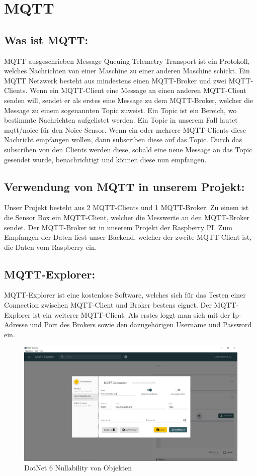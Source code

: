 \section{MQTT}

\subsection{Was ist MQTT:}
MQTT ausgeschrieben Message Queuing  Telemetry Transport ist ein Protokoll, welches Nachrichten von einer Maschine zu einer anderen Maschine schickt. 
Ein MQTT Netzwerk besteht  aus mindestens einen MQTT-Broker und zwei MQTT-Clients. 
Wenn ein MQTT-Client eine Message an einen anderen MQTT-Client senden will, sendet er als erstes eine Message zu dem MQTT-Broker, welcher die Message zu einem sogenannten Topic zuweist.
Ein Topic ist ein Bereich, wo bestimmte Nachrichten aufgelistet werden. 
Ein Topic in unserem Fall lautet mqtt/noice für den Noice-Sensor.  
Wenn ein oder mehrere MQTT-Clients diese Nachricht empfangen wollen, dann subscriben diese auf das Topic. 
Durch das subscriben von den Clients werden diese, sobald eine neue Message an das Topic gesendet wurde, benachrichtigt und können diese nun empfangen. 

\subsection {Verwendung von MQTT in unserem Projekt:}
Unser Projekt besteht aus 2 MQTT-Clients und 1 MQTT-Broker. 
Zu einem ist die Sensor Box ein MQTT-Client, welcher die Messwerte an den MQTT-Broker sendet. 
Der MQTT-Broker ist in unserem Projekt der Raspberry PI. 
Zum Empfangen der Daten liest unser Backend, welcher der zweite MQTT-Client ist, die Daten vom Raspberry ein.

\subsection{MQTT-Explorer:}
MQTT-Explorer ist eine kostenlose Software, welches sich für das Testen einer Connection zwischen MQTT-Client und Broker bestens eignet.
Der MQTT-Explorer ist ein weiterer MQTT-Client.
Als erstes loggt man sich mit der Ip-Adresse und Port des Brokers sowie den dazugehörigen Username und Password ein.

\begin{figure}[H]
    \centering
    \includegraphics[width=1\textwidth]{pics/MQTTExplorerStartScreen.JPG}
    \caption{DotNet 6 Nullability von Objekten}
\end{figure}


